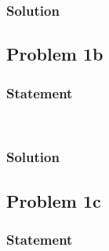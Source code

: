 \documentclass[conf]{new-aiaa}
\begin{document}

\subsubsection*{Solution} 



\subsection*{Problem 1b} 

\subsubsection*{Statement} 
\begin{center}
	 \\
\end{center}


\subsubsection*{Solution} 




\subsection*{Problem 1c} 

\subsubsection*{Statement} 
\begin{center}
	 \\
\end{center}
\end{document}

